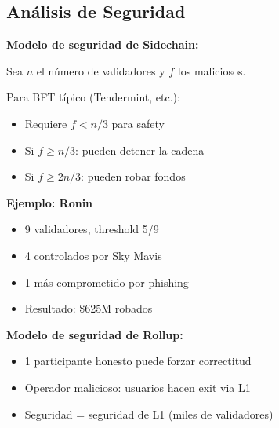 \documentclass[11pt,a4paper,twoside,openright]{book}
\theoremstyle{definition}
\theoremstyle{plain}
\theoremstyle{remark}
\begin{document}
\subsection{Análisis de Seguridad}

\begin{mathnote}
\textbf{Modelo de seguridad de Sidechain:}

Sea $n$ el número de validadores y $f$ los maliciosos.

Para BFT típico (Tendermint, etc.):
\begin{itemize}
    \item Requiere $f < n/3$ para safety
    \item Si $f \geq n/3$: pueden detener la cadena
    \item Si $f \geq 2n/3$: pueden robar fondos
\end{itemize}

\textbf{Ejemplo: Ronin}
\begin{itemize}
    \item 9 validadores, threshold 5/9
    \item 4 controlados por Sky Mavis
    \item 1 más comprometido por phishing
    \item Resultado: \$625M robados
\end{itemize}

\textbf{Modelo de seguridad de Rollup:}

\begin{itemize}
    \item 1 participante honesto puede forzar correctitud
    \item Operador malicioso: usuarios hacen exit via L1
    \item Seguridad = seguridad de L1 (miles de validadores)
\end{itemize}
\end{mathnote}
\end{document}
